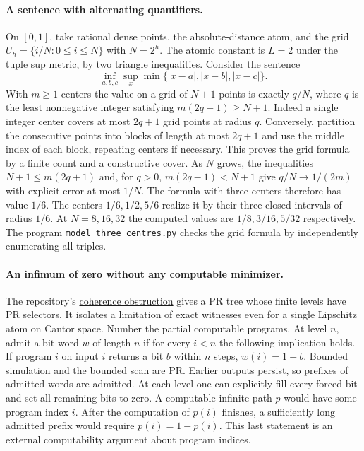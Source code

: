 \paragraph{A sentence with alternating quantifiers.}
On $[0,1]$, take rational dense points, the absolute-distance atom, and
the grid $U_h=\{i/N:0\le i\le N\}$ with $N=2^h$. The atomic constant
is $L=2$ under the tuple sup metric, by two triangle inequalities.
Consider the sentence
\[
 \inf_{a,b,c}\sup_x \min\{|x-a|,|x-b|,|x-c|\}.
\]
With $m\ge1$ centers the value on a grid of $N+1$ points is exactly $q/N$,
where $q$ is the least nonnegative integer satisfying
$m(2q+1)\ge N+1$. Indeed a single integer center covers at most $2q+1$
grid points at radius $q$. Conversely, partition the consecutive points
into blocks of length at most $2q+1$ and use the middle index of each
block, repeating centers if necessary. This proves the grid formula by a
finite count and a constructive cover. As $N$ grows, the inequalities
$N+1\le m(2q+1)$ and, for $q>0$, $m(2q-1)<N+1$ give
$q/N\to 1/(2m)$ with explicit error at most $1/N$.
The formula with three centers therefore has value $1/6$. The centers
$1/6,1/2,5/6$ realize it by their three closed intervals of radius
$1/6$. At $N=8,16,32$ the computed values are $1/8,3/16,5/32$
respectively. The program \texttt{model\_three\_centres.py} checks the
grid formula by independently enumerating all triples.

\paragraph{An infimum of zero without any computable minimizer.}
The repository's \href{https://github.com/VladimirReshetnikov/ProveIt/blob/5f3be02388442f16487d2dc5c2529961dd783d2b/Logic/PrimitiveRecursiveArithmetic/Derivations/Lean/IPRADerivations/Foundations/CoherenceObstruction.lean}{coherence obstruction} gives a PR tree
whose finite levels have PR selectors. It isolates a limitation of exact
witnesses even for a single Lipschitz atom on Cantor space. Number the
partial computable programs. At level $n$, admit a bit word $w$ of length
$n$ if for every $i<n$ the following implication holds. If program $i$
on input $i$ returns a bit $b$ within $n$ steps, $w(i)=1-b$.
Bounded simulation and the bounded scan are PR. Earlier outputs persist,
so prefixes of admitted words are admitted. At each level one can
explicitly fill every forced bit and set all remaining bits to zero.
A computable infinite path $p$ would have some program index $i$. After the computation of $p(i)$ finishes, a sufficiently long admitted
prefix would require $p(i)=1-p(i)$. This last statement is an external
computability argument about program indices.

